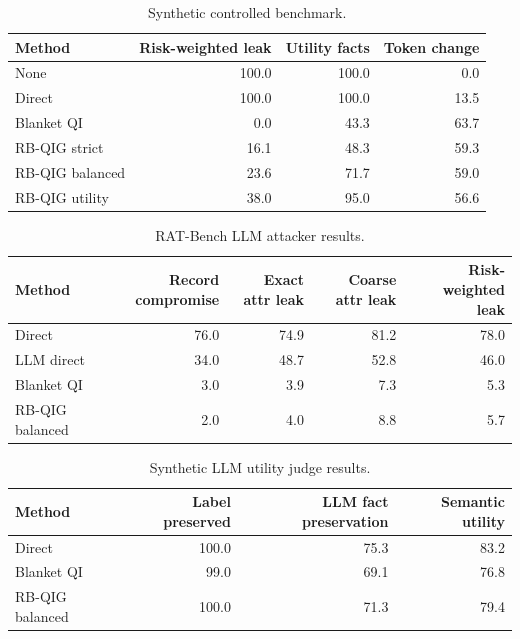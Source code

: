 \begin{table}[t]
\centering
\begingroup
\setlength{\tabcolsep}{3pt}
\small
\caption{Synthetic controlled benchmark.}
\label{tab:synthetic}
\begin{tabular}{lrrr}
\toprule
Method & Risk-weighted leak & Utility facts & Token change \\
\midrule
None & 100.0 & 100.0 & 0.0 \\
Direct & 100.0 & 100.0 & 13.5 \\
Blanket QI & 0.0 & 43.3 & 63.7 \\
RB-QIG strict & 16.1 & 48.3 & 59.3 \\
RB-QIG balanced & 23.6 & 71.7 & 59.0 \\
RB-QIG utility & 38.0 & 95.0 & 56.6 \\
\bottomrule
\end{tabular}
\endgroup
\end{table}

\begin{table}[t]
\centering
\begingroup
\setlength{\tabcolsep}{3pt}
\small
\caption{RAT-Bench LLM attacker results.}
\label{tab:ratbench-llm}
\begin{tabular}{lrrrr}
\toprule
Method & Record compromise & Exact attr leak & Coarse attr leak & Risk-weighted leak \\
\midrule
Direct & 76.0 & 74.9 & 81.2 & 78.0 \\
LLM direct & 34.0 & 48.7 & 52.8 & 46.0 \\
Blanket QI & 3.0 & 3.9 & 7.3 & 5.3 \\
RB-QIG balanced & 2.0 & 4.0 & 8.8 & 5.7 \\
\bottomrule
\end{tabular}
\endgroup
\end{table}

\begin{table}[t]
\centering
\begingroup
\setlength{\tabcolsep}{3pt}
\small
\caption{Synthetic LLM utility judge results.}
\label{tab:llm-utility}
\begin{tabular}{lrrr}
\toprule
Method & Label preserved & LLM fact preservation & Semantic utility \\
\midrule
Direct & 100.0 & 75.3 & 83.2 \\
Blanket QI & 99.0 & 69.1 & 76.8 \\
RB-QIG balanced & 100.0 & 71.3 & 79.4 \\
\bottomrule
\end{tabular}
\endgroup
\end{table}

